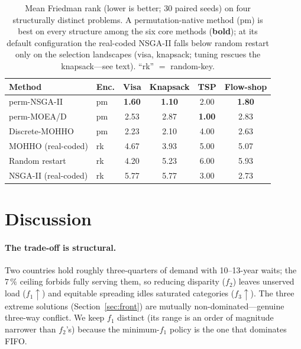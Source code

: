 \documentclass[runningheads]{llncs}
\begin{document}
\begin{table}[t]
\centering
\caption{Mean Friedman rank (lower is better; 30 paired seeds) on four structurally distinct problems. A permutation-native method (pm) is best on every structure among the six core methods (\textbf{bold}); at its default configuration the real-coded NSGA-II falls below random restart only on the selection landscapes (visa, knapsack; tuning rescues the knapsack---see text). ``rk'' $=$ random-key.}
\label{tab:structures}
\small
\begin{tabular}{llcccc}
\toprule
\textbf{Method} & \textbf{Enc.} & \textbf{Visa} & \textbf{Knapsack} & \textbf{TSP} & \textbf{Flow-shop}\\
\midrule
perm-NSGA-II        & pm & \textbf{1.60} & \textbf{1.10} & 2.00 & \textbf{1.80}\\
perm-MOEA/D         & pm & 2.53 & 2.87 & \textbf{1.00} & 2.83\\
Discrete-MOHHO      & pm & 2.23 & 2.10 & 4.00 & 2.63\\
\midrule
MOHHO (real-coded)  & rk & 4.67 & 3.93 & 5.00 & 5.07\\
Random restart      & rk & 4.20 & 5.23 & 6.00 & 5.93\\
NSGA-II (real-coded)& rk & 5.77 & 5.77 & 3.00 & 2.73\\
\bottomrule
\end{tabular}
\end{table}

\section{Discussion}
\label{sec:discussion}

\paragraph{The trade-off is structural.}
Two countries hold roughly three-quarters of demand with 10--13-year waits; the $7\,\%$ ceiling forbids fully serving them, so reducing disparity ($f_2$) leaves unserved load ($f_1\!\uparrow$) and equitable spreading idles saturated categories ($f_3\!\uparrow$). The three extreme solutions (Section~\ref{sec:front}) are mutually non-dominated---genuine three-way conflict. We keep $f_1$ distinct (its range is an order of magnitude narrower than $f_2$'s) because the minimum-$f_1$ policy is the one that dominates FIFO.
\end{document}
